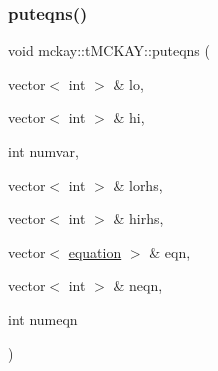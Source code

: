 \mbox{\label{classmckay_1_1t_m_c_k_a_y_a24360ef14adb39edfb6ad5c78ef246c2}} 
\subsubsection{\texorpdfstring{puteqns()}{puteqns()}}
{\footnotesize\ttfamily void mckay\+::t\+M\+C\+K\+A\+Y\+::puteqns (\begin{DoxyParamCaption}\item[{vector$<$ int $>$ \&}]{lo,  }\item[{vector$<$ int $>$ \&}]{hi,  }\item[{int}]{numvar,  }\item[{vector$<$ int $>$ \&}]{lorhs,  }\item[{vector$<$ int $>$ \&}]{hirhs,  }\item[{vector$<$ \mbox{\hyperlink{namespacemckay_a4f7cb66ed07fe573b2b08e73ab462c1a}{equation}} $>$ \&}]{eqn,  }\item[{vector$<$ int $>$ \&}]{neqn,  }\item[{int}]{numeqn }\end{DoxyParamCaption})\hspace{0.3cm}{\ttfamily [protected]}}

\mbox{\label{classmckay_1_1t_m_c_k_a_y_a5f9cf01a66eebb00e706ac5d5cd900d8}} 
